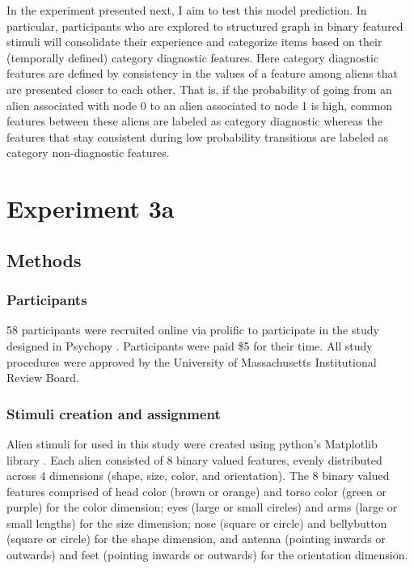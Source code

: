 In the experiment presented next, I aim to test this model prediction. In particular, participants who are explored to structured graph in binary featured stimuli will consolidate their experience and categorize items based on their (temporally defined) category diagnostic features. Here category diagnostic features are defined by consistency in the values of a feature among aliens that are presented closer to each other. That is, if the probability of going from an alien associated with node 0 to an alien associated to node 1 is high, common features between these aliens are labeled as category diagnostic whereas the features that stay consistent during low probability transitions are labeled as category non-diagnostic features. 

\section{Experiment 3a}

\subsection{Methods}

\subsubsection*{Participants}
58 participants were recruited online via prolific to participate in the study designed in Psychopy \parencite{peirce2007psychopy}. Participants were paid \$5 for their time. All study procedures were approved by the University of Massachusetts Institutional Review Board. 

\subsubsection*{Stimuli creation and assignment}
Alien stimuli for used in this study were created using python's Matplotlib library \parencite{hunter2007matplotlib}. Each alien consisted of 8 binary valued features, evenly distributed across 4 dimensions (shape, size, color, and orientation). The 8 binary valued features comprised of head color (brown or orange) and torso color (green or purple) for the color dimension; eyes (large or small circles) and arms (large or small lengths) for the size dimension; nose (square or circle) and bellybutton (square or circle) for the shape dimension, and antenna (pointing inwards or outwards) and feet (pointing inwards or outwards) for the orientation dimension. 

